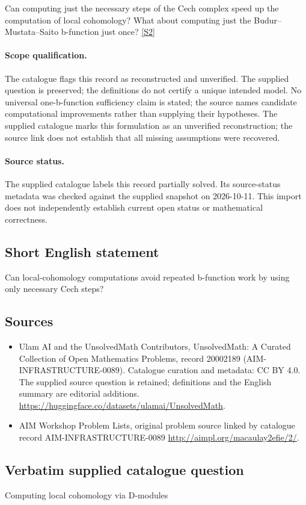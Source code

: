 \documentclass[11pt]{article}
\begin{document}
Can computing just the necessary steps of the Cech complex speed up the computation of local cohomology? What about computing just the Budur--Mustata--Saito b-function just once? \href{http://aimpl.org/macaulay2efie/2/}{[S2]}
\paragraph{Scope qualification.}
The catalogue flags this record as reconstructed and unverified. The supplied question is preserved; the definitions do not certify a unique intended model. No universal one-b-function sufficiency claim is stated; the source names candidate computational improvements rather than supplying their hypotheses.
The supplied catalogue marks this formulation as an unverified reconstruction; the source link does not establish that all missing assumptions were recovered.
\paragraph{Source status.}
The supplied catalogue labels this record partially solved. Its source-status metadata was checked against the supplied snapshot on 2026-10-11. This import does not independently establish current open status or mathematical correctness.
\subsection{Short English statement}
Can local-cohomology computations avoid repeated b-function work by using only necessary Cech steps?
\subsection{Sources}
\begin{itemize}
\item[S1] Ulam AI and the UnsolvedMath Contributors, UnsolvedMath: A Curated Collection of Open Mathematics Problems, record 20002189 (AIM-INFRASTRUCTURE-0089). Catalogue curation and metadata: CC BY 4.0. The supplied source question is retained; definitions and the English summary are editorial additions.
\url{https://huggingface.co/datasets/ulamai/UnsolvedMath}.
\item[S2] AIM Workshop Problem Lists, original problem source linked by catalogue record AIM-INFRASTRUCTURE-0089
\url{http://aimpl.org/macaulay2efie/2/}.
\end{itemize}
\subsection{Verbatim supplied catalogue question}
Computing local cohomology via D-modules
\end{document}
